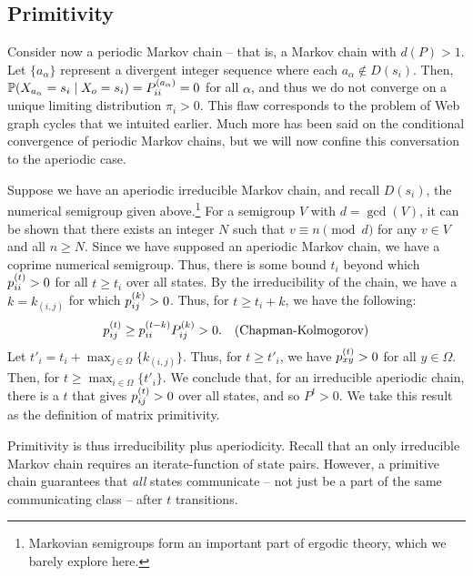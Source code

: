 \documentclass[../exploring-pagerank.tex]{subfiles}
\begin{document}
    \subsection{Primitivity}
    Consider now a periodic Markov chain -- that is, a Markov chain with $d(P) > 1$. Let $\{a_\alpha\}$ represent a divergent integer sequence where each $a_\alpha \notin D(s_i)$. Then, $\mathbb{P}(X_{a_\alpha} = s_i \mid X_o = s_i) = P^{(a_\alpha)}_{ii} = 0$ for all $\alpha$, and thus we do not converge on a unique limiting distribution $\pi_i > 0$. This flaw corresponds to the problem of Web graph cycles that we intuited earlier. Much more has been said on the conditional convergence of periodic Markov chains, but we will now confine this conversation to the aperiodic case.

    Suppose we have an aperiodic irreducible Markov chain, and recall $D(s_i)$, the numerical semigroup given above.\footnote{Markovian semigroups form an important part of ergodic theory, which we barely explore here.} For a semigroup $V$ with $d=\gcd(V)$, it can be shown that there exists an integer $N$ such that $v\equiv n \pmod{d}$ for any $v\in V$ and all $n \geq N$. Since we have supposed an aperiodic Markov chain, we have a coprime numerical semigroup. Thus, there is some bound $t_i$ beyond which $p^{(t)}_{ii} > 0$ for all $t \geq t_i$ over all states. By the irreducibility of the chain, we have a $k = k_{(i,j)}$ for which $p^{(k)}_{ij} > 0$. Thus, for $t \geq t_i + k$, we have the following:
    \begin{align*}
        p^{(t)}_{ij} \geq p^{(t-k)}_{ii} P^{(k)}_{ij} > 0. && \text{(Chapman-Kolmogorov)}
    \end{align*}
    Let $t'_i = t_i + \max_{j\in\Omega}\{ k_{(i,j)} \}$. Thus, for $t \geq t'_i$, we have $p^{(t)}_{xy} > 0$ for all $y\in\Omega$. Then, for $t \geq \max_{i\in\Omega}\{ t'_i \}$. We conclude that, for an irreducible aperiodic chain, there is a $t$ that gives $p^{(t)}_{ij} > 0$ over all states, and so $P^t > 0$. We take this result as the definition of matrix primitivity.

    Primitivity is thus irreducibility plus aperiodicity. Recall that an only irreducible Markov chain requires an iterate-function of state pairs. However, a primitive chain guarantees that \textit{all} states communicate -- not just be a part of the same communicating class -- after $t$ transitions.
\end{document}
